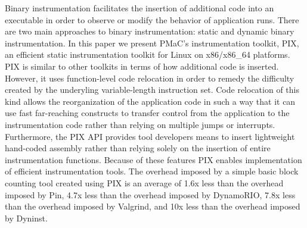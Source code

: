 \begin{it}

Binary instrumentation facilitates the insertion of additional code into an
executable in order to observe or modify the behavior of application runs. 
There are two main approaches to binary instrumentation: static and dynamic
binary instrumentation. In this paper we present PMaC's instrumentation toolkit, PIX, 
an efficient static instrumentation toolkit for Linux on x86/x86\_64 platforms. PIX
is similar to  other toolkits in terms of how additional code is inserted. However, it uses function-level
code relocation in order to remedy the difficulty created by the underyling variable-length instruction set. 
Code relocation of this kind allows the reorganization of the application code in such a way that it
can use fast far-reaching constructs to transfer control
from the application to the instrumentation code rather than relying on multiple
jumps or interrupts. Furthermore, the PIX API provides 
tool developers means to insert lightweight hand-coded assembly
rather than relying solely on the insertion of entire instrumentation functions.
Because of these features PIX enables implementation of efficient instrumentation tools. 
The overhead imposed by a simple basic block counting tool created using PIX is an
average of 1.6x less than the overhead imposed by Pin, 4.7x less than the overhead imposed by
DynamoRIO, 7.8x less than the overhead imposed by Valgrind, and 10x less than the overhead imposed by Dyninst.

\end{it}
